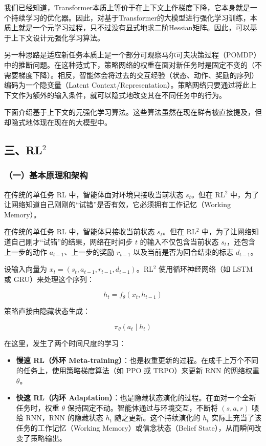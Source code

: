 我们已经知道，Transformer本质上等价于在上下文上作梯度下降，它本身就是一个持续学习的优化器。因此，对基于Transformer的大模型进行强化学习训练，本质上就是一个元学习过程，只不过没有显式地求二阶Hessian矩阵。因此，可以基于上下文设计元强化学习算法。

另一种思路是适应新任务本质上是一个部分可观察马尔可夫决策过程（POMDP）中的推断问题。在这种范式下，策略网络的权重在面对新任务时是固定不变的（不需要梯度下降）。相反，智能体会将过去的交互经验（状态、动作、奖励的序列）编码为一个隐变量（Latent Context/Representation）。策略网络只要通过将此上下文作为额外的输入条件，就可以隐式地改变其在不同任务中的行为。

下面介绍基于上下文的元强化学习算法。这些算法虽然在现在鲜有被直接提及，但却隐式地体现在现在的大模型中。

\hypertarget{ux4e09rl2}{%
\subsection{\texorpdfstring{三、RL\(^2\)}{三、RL\^{}2}}\label{ux4e09rl2}}

\hypertarget{ux4e00ux57faux672cux539fux7406ux548cux67b6ux6784}{%
\subsubsection{（一）基本原理和架构}\label{ux4e00ux57faux672cux539fux7406ux548cux67b6ux6784}}

在传统的单任务 RL 中，智能体面对环境只接收当前状态 \(s_t\)。但在 RL\(^2\) 中，为了让网络知道自己刚刚的``试错''是否有效，它必须拥有工作记忆（Working Memory）。

在传统的单任务 RL 中，智能体只接收当前状态 \(s_t\)。但在 RL\(^2\) 中，为了让网络知道自己刚才``试错''的结果，网络在时间步 \(t\) 的输入不仅包含当前状态 \(s_t\)，还包含上一步的动作 \(a_{t-1}\)、上一步的奖励 \(r_{t-1}\) 以及当前是否为回合结束的标志 \(d_{t-1}\)。

设输入向量为 \(x_t=(s_t,a_{t-1},r_{t-1},d_{t-1})\)。RL\(^2\) 使用循环神经网络（如 LSTM 或 GRU）来处理这个序列：

\[
h_t = f_{\theta}(x_t,h_{t-1})
\]

策略直接由隐藏状态生成：

\[
\pi_{\theta}(a_t\mid h_t)
\]

在这里，发生了两个时间尺度的学习：

\begin{itemize}
\tightlist
\item
  \textbf{慢速 RL（外环 Meta-training）}：也是权重更新的过程。在成千上万个不同的任务上，使用策略梯度算法（如 PPO 或 TRPO）来更新 RNN 的网络权重 \(\theta\)。
\item
  \textbf{快速 RL（内环 Adaptation）}：也是隐藏状态演化的过程。在面对一个全新任务时，权重 \(\theta\) 保持固定不动。智能体通过与环境交互，不断将 \((s,a,r)\) 喂给 RNN，RNN 的隐藏状态 \(h_t\) 随之更新。这个持续演化的 \(h_t\) 实际上充当了该任务的工作记忆（Working Memory）或信念状态（Belief State），从而瞬间改变了策略输出。
\end{itemize}


